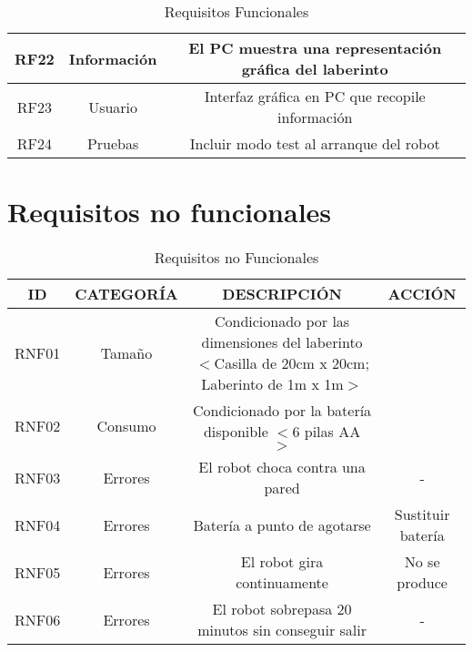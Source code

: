\begin{center}
\begin{table}[h!]
\begin{adjustbox}{max width=\textwidth}
\begin{tabular}{|c|c|c|}
    \rowcolor{green!20}

    RF22 & Información & El PC muestra una representación gráfica del laberinto  \\ \hline
    \rowcolor{orange!40}


    RF23 & Usuario & Interfaz gráfica en PC que recopile información \\ \hline

    \rowcolor{blue!20}

    RF24 & Pruebas & Incluir modo test al arranque del robot \\ \hline

  \end{tabular}
\end{adjustbox}
  \caption{Requisitos Funcionales}
  \label{ReqFuncionales}

\end{table}
\end{center}

\vspace{-20pt}
\section{Requisitos no funcionales}
\begin{center}
\begin{table}[h!]
  \begin{adjustbox}{max width=\textwidth}
  \begin{tabular}{|c|c|c|c|}
    \hline
    ID & CATEGORÍA & DESCRIPCIÓN & ACCIÓN \\ \hline
    \rowcolor{blue!20}

    RNF01 & Tamaño & Condicionado por las dimensiones del laberinto $<$Casilla de 20cm x 20cm; Laberinto de 1m x 1m$>$ &   \\ \hline
    \rowcolor{green!40}

    RNF02 & Consumo & Condicionado por la batería disponible $<$6 pilas AA $>$ &  \\ \hline
    \rowcolor{red!25}

    RNF03 & Errores & El robot choca contra una pared & - \\ \hline
    \rowcolor{red!25}

    RNF04 & Errores & Batería a punto de agotarse & Sustituir batería \\ \hline
    \rowcolor{red!25}

    RNF05 & Errores & El robot gira continuamente & No se produce \\ \hline
    \rowcolor{red!25}

    RNF06 & Errores & El robot sobrepasa 20 minutos sin conseguir salir & - \\ \hline

  \end{tabular}
\end{adjustbox}
  \caption{Requisitos no Funcionales}
  \label{ReqNoFuncionales}

\end{table}
\end{center}
